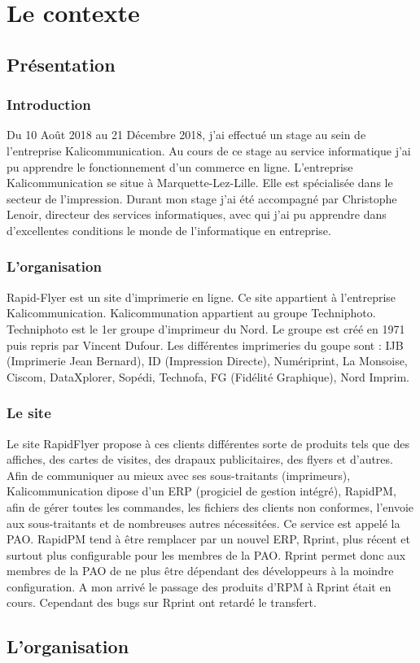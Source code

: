 \documentclass[a4paper]{report}
\begin{document}
\part{Le contexte}
\chapter{Présentation}
\section{Introduction}
Du 10 Août 2018 au 21 Décembre 2018, j'ai effectué un stage au sein de l'entreprise Kalicommunication. Au cours de ce stage au service informatique j'ai pu apprendre le fonctionnement d'un commerce en ligne.\newline
L'entreprise Kalicommunication se situe à Marquette-Lez-Lille. Elle est spécialisée dans le secteur de l'impression. Durant mon stage j'ai été accompagné par Christophe Lenoir, directeur des services informatiques, avec qui j'ai pu apprendre dans d'excellentes conditions le monde de l'informatique en entreprise.
\section{L'organisation}
Rapid-Flyer est un site d’imprimerie en ligne. Ce site appartient à l’entreprise Kalicommunication. Kalicommunation appartient au groupe Techniphoto. 
Techniphoto est le 1er groupe d'imprimeur du Nord. 
Le groupe est créé en 1971 puis repris par Vincent Dufour. Les différentes imprimeries du goupe sont : IJB (Imprimerie Jean Bernard), ID (Impression Directe), Numériprint, La Monsoise, Ciscom, DataXplorer, Sopédi, Technofa, FG (Fidélité Graphique), Nord Imprim. 

\section{Le site}
Le site RapidFlyer propose à ces clients différentes sorte de produits tels que des affiches, des cartes de visites, des drapaux publicitaires, des flyers et d’autres. 
Afin de communiquer au mieux avec ses sous-traitants (imprimeurs), Kalicommunication dipose d’un ERP (progiciel de gestion intégré), RapidPM, afin de gérer toutes les commandes, les fichiers des clients non conformes, l’envoie aux sous-traitants et de nombreuses autres nécessitées. Ce service est appelé la PAO. RapidPM tend à être remplacer par un nouvel ERP, Rprint, plus récent et surtout plus configurable pour les membres de la PAO. Rprint permet donc aux membres de la PAO de ne plus être dépendant des développeurs à la moindre configuration. A mon arrivé le passage des produits d’RPM à Rprint était en cours. Cependant des bugs sur Rprint ont retardé le transfert. %

\chapter{L'organisation}
\end{document}
